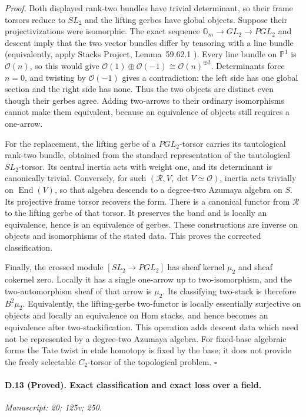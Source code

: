 \emph{Proof.} Both displayed rank-two bundles have trivial determinant, so their frame torsors reduce to $SL_2$ and the lifting gerbes have global objects. Suppose their projectivizations were isomorphic. The exact sequence $\mathbb G_m\to GL_2\to PGL_2$ and descent imply that the two vector bundles differ by tensoring with a line bundle (equivalently, apply Stacks Project, Lemma~59.62.1 \citep{StacksAzumaya}). Every line bundle on $\mathbb P^1$ is $\mathcal O(n)$, so this would give $\mathcal O(1)\oplus\mathcal O(-1)\cong\mathcal O(n)^{\oplus2}$. Determinants force $n=0$, and twisting by $\mathcal O(-1)$ gives a contradiction: the left side has one global section and the right side has none. Thus the two objects are distinct even though their gerbes agree. Adding two-arrows to their ordinary isomorphisms cannot make them equivalent, because an equivalence of objects still requires a one-arrow.

For the replacement, the lifting gerbe of a $PGL_2$-torsor carries its tautological rank-two bundle, obtained from the standard representation of the tautological $SL_2$-torsor. Its central inertia acts with weight one, and its determinant is canonically trivial. Conversely, for such $(\mathcal R,V,\det V\simeq\mathcal O)$, inertia acts trivially on $\operatorname{End}(V)$, so that algebra descends to a degree-two Azumaya algebra on $S$. Its projective frame torsor recovers the form. There is a canonical functor from $\mathcal R$ to the lifting gerbe of that torsor. It preserves the band and is locally an equivalence, hence is an equivalence of gerbes. These constructions are inverse on objects and isomorphisms of the stated data. This proves the corrected classification.

Finally, the crossed module $[SL_2\to PGL_2]$ has sheaf kernel $\mu_2$ and sheaf cokernel zero. Locally it has a single one-arrow up to two-isomorphism, and the two-automorphism sheaf of that arrow is $\mu_2$. Its classifying two-stack is therefore $B^2\mu_2$. Equivalently, the lifting-gerbe two-functor is locally essentially surjective on objects and locally an equivalence on Hom stacks, and hence becomes an equivalence after two-stackification. This operation adds descent data which need not be represented by a degree-two Azumaya algebra. For fixed-base algebraic forms the Tate twist in etale homotopy is fixed by the base; it does not provide the freely selectable $C_2$-torsor of the topological problem. \hfill$\square$

\paragraph{D.13 (Proved). Exact classification and exact loss over a field.}
\textit{Manuscript: 20; 125v; 250.}

